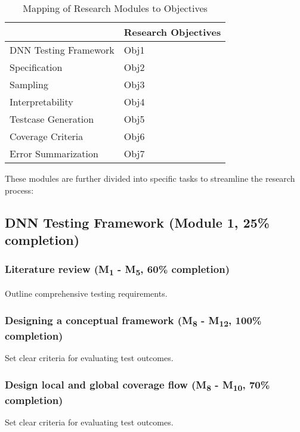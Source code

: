 \begin{table}[ht]
  \centering
  \renewcommand{\arraystretch}{1.5} %
  \begin{tabular}{|l|l|}
    \hline
    \rowcolor[HTML]{000000} 
    \multicolumn{1}{|c|}{\cellcolor[HTML]{000000}{\color[HTML]{FFFFFF} \textbf{Research Modules}}} & {\color[HTML]{FFFFFF} \textbf{Research Objectives}} \\ \hline
    {\color[HTML]{404040} DNN Testing Framework} & Obj1 \\ \hline
    {\color[HTML]{404040} Specification} & Obj2 \\ \hline
    {\color[HTML]{404040} Sampling} & Obj3 \\ \hline
    {\color[HTML]{404040} Interpretability} & Obj4 \\ \hline
    {\color[HTML]{404040} Testcase Generation} & Obj5 \\ \hline
    {\color[HTML]{404040} Coverage Criteria} & Obj6 \\ \hline
    Error Summarization & Obj7 \\ \hline
  \end{tabular}
  \caption{Mapping of Research Modules to Objectives}
  \label{table:modules}
\end{table}

These modules are further divided into specific tasks to streamline the research process:

\subsection{DNN Testing Framework (Module 1, 25\% completion)}
\subsubsection{Literature review (M\textsubscript{1} - M\textsubscript{5}, 60\% completion)}
Outline comprehensive testing requirements.

\subsubsection{Designing a conceptual framework (M\textsubscript{8} - M\textsubscript{12}, 100\% completion)}
Set clear criteria for evaluating test outcomes.

\subsubsection{Design local and global coverage flow (M\textsubscript{8} - M\textsubscript{10}, 70\% completion)}
Set clear criteria for evaluating test outcomes.

